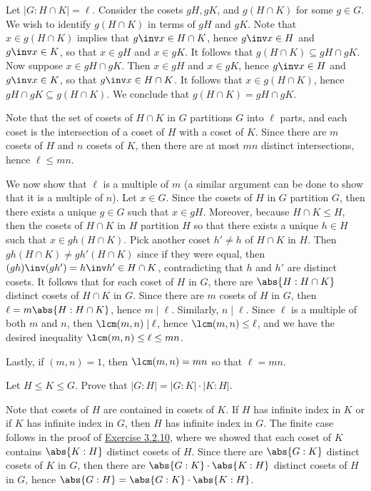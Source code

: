 \begin{sol} 
    Let $|G : H \cap K| = \ell$. Consider the cosets $gH, gK$, and $g(H \cap K)$ for some $g \in G$. We wish to identify $g(H \cap K)$ in terms of $gH$ and $gK$. Note that $x \in g(H \cap K)$ implies that $g\inv x \in H \cap K$, hence $g\inv x \in H$ and $g\inv x \in K$, so that $x \in gH$ and $x \in gK$. It follows that $g(H \cap K) \subseteq gH \cap gK$. Now suppose $x \in gH \cap gK$. Then $x \in gH$ and $x \in gK$, hence $g\inv x \in H$ and $g\inv x \in K$, so that $g\inv x \in H \cap K$. It follows that $x \in g(H \cap K)$, hence $gH \cap gK \subseteq g(H \cap K)$. We conclude that $g(H \cap K) = gH \cap gK$.

    Note that the set of cosets of $H \cap K$ in $G$ partitions $G$ into $\ell$ parts, and each coset is the intersection of a coset of $H$ with a coset of $K$. Since there are $m$ cosets of $H$ and $n$ cosets of $K$, then there are at most $mn$ distinct intersections, hence $\ell \leq mn$. 

    We now show that $\ell$ is a multiple of $m$ (a similar argument can be done to show that it is a multiple of $n$). Let $x \in G$. Since the cosets of $H$ in $G$ partition $G$, then there exists a unique $g \in G$ such that $x \in gH$. Moreover, because $H \cap K \leq H$, then the cosets of $H \cap K$ in $H$ partition $H$ so that there exists a unique $h \in H$ such that $x \in gh(H \cap K)$. Pick another coset $h' \neq h$ of $H \cap K$ in $H$. Then $gh(H \cap K) \neq gh'(H \cap K)$ since if they were equal, then $(gh)\inv(gh') = h\inv h' \in H \cap K$, contradicting that $h$ and $h'$ are distinct cosets. It follows that for each coset of $H$ in $G$, there are $\abs{H : H \cap K}$ distinct cosets of $H \cap K$ in $G$. Since there are $m$ cosets of $H$ in $G$, then $\ell = m \abs{H : H \cap K}$, hence $m \mid \ell$. Similarly, $n \mid \ell$. Since $\ell$ is a multiple of both $m$ and $n$, then $\lcm(m, n) \mid \ell$, hence $\lcm(m, n) \leq \ell$, and we have the desired inequality $\lcm(m, n) \leq \ell \leq mn$.

    Lastly, if $(m, n) = 1$, then $\lcm(m, n) = mn$ so that $\ell = mn$.
\end{sol}

\begin{specialexercise}\label{ex3.2.11}
    Let $H \leq K \leq G$. Prove that $|G : H| = |G : K| \cdot |K : H|$. 
\end{specialexercise}

\begin{sol}
    Note that cosets of $H$ are contained in cosets of $K$. If $H$ has infinite index in $K$ or if $K$ has infinite index in $G$, then $H$ has infinite index in $G$. The finite case follows in the proof of \hyperref[ex3.2.10]{Exercise 3.2.10}, where we showed that each coset of $K$ contains $\abs{K : H}$ distinct cosets of $H$. Since there are $\abs{G : K}$ distinct cosets of $K$ in $G$, then there are $\abs{G : K} \cdot \abs{K : H}$ distinct cosets of $H$ in $G$, hence $\abs{G : H} = \abs{G : K} \cdot \abs{K : H}$.
\end{sol}

